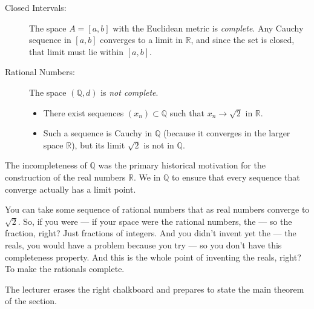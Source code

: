 \begin{math-stroke}
\begin{description}
    \item[Closed Intervals:] The space $A = [a, b]$ with the Euclidean metric is \emph{complete}. Any Cauchy sequence in $[a, b]$ converges to a limit in $\mathbb{R}$, and since the set is closed, that limit must lie within $[a, b]$.
    \item[Rational Numbers:] The space $(\mathbb{Q}, d)$ is \emph{not complete}.
    \begin{itemize}
        \item There exist sequences $(x_n) \subset \mathbb{Q}$ such that $x_n \to \sqrt{2}$ in $\mathbb{R}$.
        \item Such a sequence is Cauchy in $\mathbb{Q}$ (because it converges in the larger space $\mathbb{R}$), but its limit $\sqrt{2}$ is not in $\mathbb{Q}$.
    \end{itemize}
\end{description}

\begin{explanation-of-steps}
The incompleteness of $\mathbb{Q}$ was the primary historical motivation for the construction of the real numbers $\mathbb{R}$. We  in $\mathbb{Q}$ to ensure that every sequence that  converge actually has a limit point.
\end{explanation-of-steps}
\end{math-stroke}

\begin{spoken-clean}[00:07:34 - 00:09:25]
You can take some sequence of rational numbers that as real numbers converge to $\sqrt{2}$. So, if you were --- if your space were the rational numbers, the --- so the fraction, right? Just fractions of integers. And you didn't invent yet the --- the reals, you would have a problem because you try --- so you don't have this completeness property. And this is the whole point of inventing the reals, right? To make the rationals complete.
\end{spoken-clean}

\begin{meta-note}[Transition]
The lecturer erases the right chalkboard and prepares to state the main theorem of the section.
\end{meta-note}

